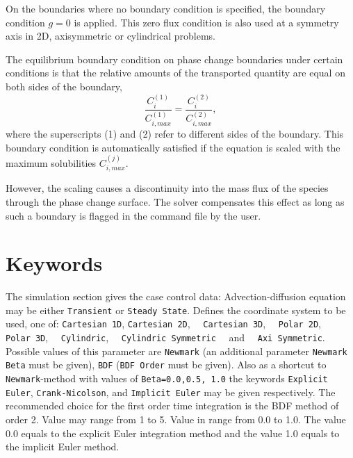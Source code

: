 \begin{versiona}
On the boundaries where no boundary condition is specified, the
boundary condition $g=0$ is applied. This zero flux
condition is also used at a symmetry axis in 2D, axisymmetric or
cylindrical problems.

The equilibrium boundary condition on phase change boundaries under
certain conditions is that the relative amounts of the transported
quantity are equal on both sides of the boundary, 
\begin{equation}
\frac{C_i^{(1)}}{C^{(1)}_{i,max}} = \frac{C_i^{(2)}}{C^{(2)}_{i,max}},
\end{equation}
where the superscripts (1) and (2) refer to different sides of the
boundary. This boundary condition is automatically satisfied if the
equation is scaled with the maximum solubilities $C^{(j)}_{i,max}$.

However, the scaling causes a discontinuity into the mass flux of the
species through the phase change surface. The solver compensates this
effect as long as such a boundary is flagged in the command file by
the user.


\section{Keywords} 
\end{versiona}

\sifbegin
{}
The simulation section gives the case control data:
\sifbegin
{} Advection-diffusion equation may be either 
{\tt Transient} or {\tt Steady State}.
 Defines the coordinate system to be used, one of:
{\tt Cartesian 1D}, {\tt Cartesian 2D},~~ {\tt Cartesian 3D},~~ {\tt Polar 2D},~~
 {\tt Polar 3D},~~ {\tt Cy\-lin\-dric},~~ {\tt Cylindric Symmetric}
~~and~~ {\tt Axi Symmetric}.
Possible values of this parameter are {\tt Newmark} (an additional
parameter {\tt Newmark Beta} must be given), {\tt BDF} ({\tt BDF Order} must be given). Also as a
shortcut to {\tt Newmark}-method with values of {\tt Beta=0.0,0.5, 1.0} the keywords 
{\tt Explicit Euler}, {\tt Crank-Nicolson}, and {\tt Implicit Euler} may be given respectively.
The recommended choice for the first order time integration is the BDF method of order 2.
Value may range from 1 to 5.
 Value in range from 0.0 to 1.0. The value 0.0 equals to
the explicit Euler integration method and the value 1.0 equals to the implicit Euler method. 
\sifend

